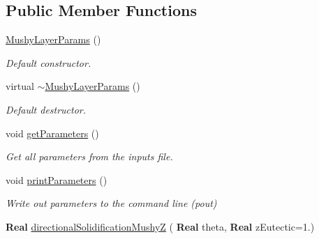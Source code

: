 \subsection*{Public Member Functions}
\begin{DoxyCompactItemize}
\item 
\mbox{\label{class_mushy_layer_params_a90d6072c0605f207643cf48fd36d856c}} 
\hyperlink{class_mushy_layer_params_a90d6072c0605f207643cf48fd36d856c}{Mushy\+Layer\+Params} ()
\begin{DoxyCompactList}\small\item\em Default constructor. \end{DoxyCompactList}\item 
\mbox{\label{class_mushy_layer_params_a5a4cb3860b79d218af7509fb04088b74}} 
virtual \hyperlink{class_mushy_layer_params_a5a4cb3860b79d218af7509fb04088b74}{$\sim$\+Mushy\+Layer\+Params} ()
\begin{DoxyCompactList}\small\item\em Default destructor. \end{DoxyCompactList}\item 
\mbox{\label{class_mushy_layer_params_a2adf3cf11a6d85e97d1bd05d21e0fda0}} 
void \hyperlink{class_mushy_layer_params_a2adf3cf11a6d85e97d1bd05d21e0fda0}{get\+Parameters} ()
\begin{DoxyCompactList}\small\item\em Get all parameters from the inputs file. \end{DoxyCompactList}\item 
\mbox{\label{class_mushy_layer_params_ab0c7b6204884af8093216788b3d1635f}} 
void \hyperlink{class_mushy_layer_params_ab0c7b6204884af8093216788b3d1635f}{print\+Parameters} ()
\begin{DoxyCompactList}\small\item\em Write out parameters to the command line (pout) \end{DoxyCompactList}\item 
\mbox{\label{class_mushy_layer_params_a63bfa2c38942a3113a2cd99c694c003b}} 
\textbf{ Real} \hyperlink{class_mushy_layer_params_a63bfa2c38942a3113a2cd99c694c003b}{directional\+Solidification\+MushyZ} (\textbf{ Real} theta, \textbf{ Real} z\+Eutectic=1.)

\end{DoxyCompactItemize}
